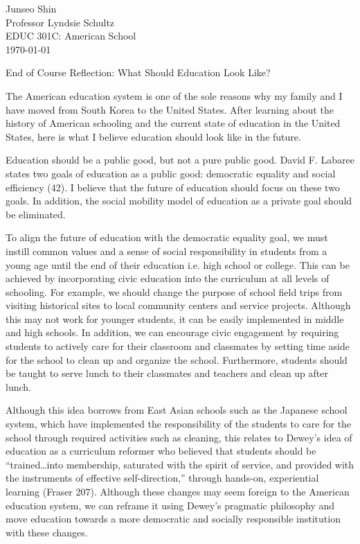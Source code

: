 \documentclass[12pt]{article}
\begin{document}
\begin{flushleft}

Junseo Shin\\
Professor Lyndsie Schultz\\
EDUC 301C: American School\\
\today{}\\


\begin{center}
    End of Course Reflection: What Should Education Look Like?
\end{center}


\setlength{\parindent}{0.5in}

The American education system is one of the sole reasons why my family and I have moved 
from South Korea to the United States. After learning about the history of American schooling
and the current state of education in the United States, here is what I believe education should
look like in the future.

Education should be a public good, but not a pure public good. David F. Labaree states two goals of
education as a public good: democratic equality and social efficiency (42). I believe that the
future of education should focus on these two goals. In addition, the social mobility model of
education as a private goal should be eliminated.

To align the future of education with the democratic equality goal, we must instill common values
and a sense of social responsibility in students from a young age until the end of their education
i.e. high school or college. This can be achieved by incorporating civic education into the
curriculum at all levels of schooling. For example, we should change the purpose of school field
trips from visiting historical sites to local community centers and service projects. Although this
may not work for younger students, it can be easily implemented in middle and high schools. 
In addition, we can encourage civic engagement by requiring students to actively care for their
classroom and classmates by setting time aside for the school to clean up and organize the school. 
Furthermore, students should be taught to serve lunch to their classmates and teachers
and clean up after lunch.

Although this idea borrows from East Asian schools such as the Japanese school system, which have 
implemented the responsibility of the students to care for the school through required activities 
such as cleaning, this relates to Dewey's idea of education as a curriculum reformer
who believed that students should be ``trained…into membership, saturated with the spirit of
service, and provided with the instruments of effective self-direction,'' through hands-on,
experiential learning (Fraser 207). Although these changes may seem foreign to the American
education system, we can reframe it using Dewey's pragmatic philosophy and move
education towards a more democratic and socially responsible institution with these changes.


\end{flushleft}
\end{document}
